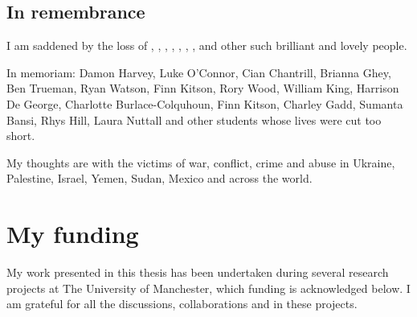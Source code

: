 \subsection{In remembrance}

I am saddened by the loss of , , , , , , , and other such brilliant and lovely people. 

In memoriam: Damon Harvey, Luke O'Connor, Cian Chantrill, Brianna Ghey, Ben Trueman, Ryan Watson, Finn Kitson, Rory Wood, William King, Harrison De George, Charlotte Burlace-Colquhoun, Finn Kitson, Charley Gadd, Sumanta Bansi, Rhys Hill, Laura Nuttall and other students whose lives were cut too short.

My thoughts are with the victims of war, conflict, crime and abuse in Ukraine, Palestine, Israel, Yemen, Sudan, Mexico and across the world.

\newpage
\section{My funding}

My work presented in this thesis has been undertaken during 
several research projects at The University of Manchester, 
which funding is acknowledged below. I am grateful for all the discussions, collaborations and in these projects.

